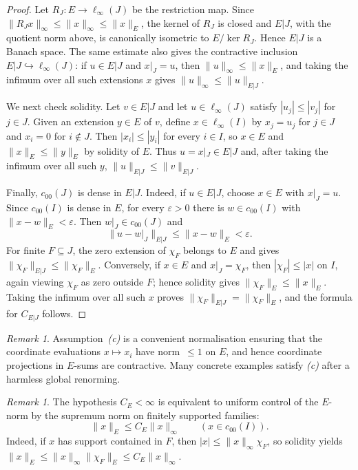 \documentclass[reqno]{amsart}
\theoremstyle{plain}
\theoremstyle{definition}
\theoremstyle{remark}
\newtheorem{remark}[theorem]{Remark}
\newcommand{\czerozero}{c_{00}}
\renewcommand{\le}{\leqslant}
\begin{document}
\begin{proof}
Let $R_J\colon E\to \ell_\infty(J)$ be the restriction map.  Since
$\|R_Jx\|_\infty\le \|x\|_\infty\le \|x\|_E$, the kernel of $R_J$ is closed and $E|J$, with the
quotient norm above, is canonically isometric to $E/\ker R_J$.  Hence $E|J$ is a Banach space.
The same estimate also gives the contractive inclusion $E|J\hookrightarrow \ell_\infty(J)$:
if $u\in E|J$ and $x|_J=u$, then $\|u\|_\infty\le \|x\|_E$, and taking the infimum over all
such extensions $x$ gives $\|u\|_\infty\le \|u\|_{E|J}$.

We next check solidity.  Let $v\in E|J$ and let $u\in\ell_\infty(J)$ satisfy
$|u_j|\le |v_j|$ for $j\in J$.  Given an extension $y\in E$ of $v$, define $x\in\ell_\infty(I)$
by $x_j=u_j$ for $j\in J$ and $x_i=0$ for $i\notin J$.  Then $|x_i|\le |y_i|$ for every
$i\in I$, so $x\in E$ and $\|x\|_E\le \|y\|_E$ by solidity of $E$.  Thus $u=x|_J\in E|J$ and,
after taking the infimum over all such $y$, $\|u\|_{E|J}\le \|v\|_{E|J}$.

Finally, $c_{00}(J)$ is dense in $E|J$.  Indeed, if $u\in E|J$, choose $x\in E$ with
$x|_J=u$.  Since $c_{00}(I)$ is dense in $E$, for every $\varepsilon>0$ there is
$w\in c_{00}(I)$ with $\|x-w\|_E<\varepsilon$.  Then $w|_J\in c_{00}(J)$ and
\[
\|u-w|_J\|_{E|J}\le \|x-w\|_E<\varepsilon.
\]
For finite $F\subseteq J$, the zero extension of $\chi_F$ belongs to $E$ and gives
$\|\chi_F\|_{E|J}\le \|\chi_F\|_E$.  Conversely, if $x\in E$ and $x|_J=\chi_F$, then
$|\chi_F|\le |x|$ on $I$, again viewing $\chi_F$ as zero outside $F$; hence solidity gives
$\|\chi_F\|_E\le \|x\|_E$.  Taking the infimum over all such $x$ proves
$\|\chi_F\|_{E|J}=\|\chi_F\|_E$, and the formula for $C_{E|J}$ follows.
\end{proof}


\begin{remark}\label{rem:norm-normalisation}
Assumption~\emph{(c)} is a convenient normalisation ensuring that the coordinate evaluations
$x\mapsto x_i$ have norm~$\le 1$ on $E$, and hence coordinate projections in $E$-sums are contractive.
Many concrete examples satisfy \emph{(c)} after a harmless global renorming.
\end{remark}


\begin{remark}\label{rem:CE}
The hypothesis $C_E<\infty$ is equivalent to uniform control of the $E$-norm by the supremum norm on finitely
supported families:
\[
\|x\|_E \le C_E\|x\|_\infty \qquad (x\in \czerozero(I)).
\]
Indeed, if $x$ has support contained in $F$, then $|x|\le \|x\|_\infty \chi_F$, so solidity yields
$\|x\|_E\le \|x\|_\infty \|\chi_F\|_E\le C_E\|x\|_\infty$.
\end{remark}
\end{document}
